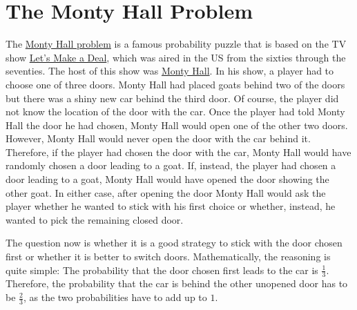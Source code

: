\section{The Monty Hall Problem}
The \href{http://en.wikipedia.org/wiki/Monty_Hall_problem}{Monty Hall problem} is a famous probability
puzzle that is based on the TV show 
\href{http://en.wikipedia.org/wiki/Let%27s_Make_a_Deal}{Let's Make a Deal}, which was aired in the
US from the sixties through the seventies.  The host of this show was 
\href{http://en.wikipedia.org/wiki/Monty_Hall}{Monty Hall}. In his show, a player had to choose one
of three doors.  Monty Hall had placed goats behind two of the doors but there was a shiny new car
behind the third door.  Of course, the player did not know the location of the door with the car.  
Once the player had told Monty Hall the door he had chosen, Monty Hall would open one of the other
two doors.  However, Monty Hall would never open the door with the car behind it.  Therefore, if the
player had chosen the door with the car, Monty Hall would have randomly chosen a door leading to a
goat.  If, instead, the player had chosen a door leading to a goat, Monty Hall would have opened the
door showing the other goat.  In either case, after opening the door  Monty Hall would ask the
player whether he wanted to stick with his first choice or whether, instead, he wanted to pick the
remaining closed door.  

The question now is whether it is a good strategy to stick with the door chosen first or whether it
is better to switch doors.  Mathematically, the reasoning is quite simple: The probability that the
door chosen first leads to the car is $\frac{1}{3}$.  Therefore, the probability that the car is behind
the other unopened door has to be $\frac{2}{3}$, as the two probabilities have to add up to $1$.  

